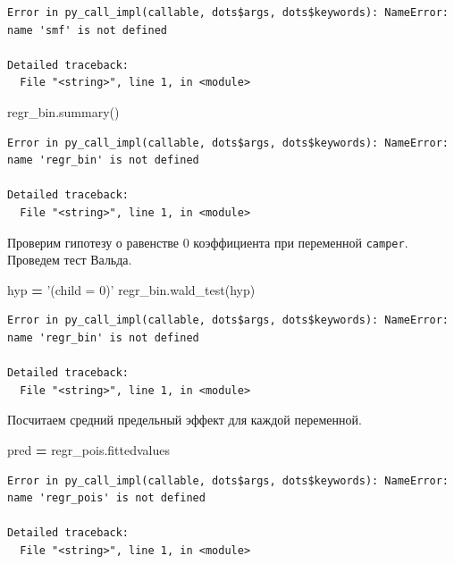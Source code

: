 \documentclass[]{book}
\newenvironment{Shaded}{\begin{snugshade}}{\end{snugshade}}
\newcommand{\NormalTok}[1]{#1}
\newcommand{\OperatorTok}[1]{\textcolor[rgb]{0.81,0.36,0.00}{\textbf{#1}}}
\newcommand{\StringTok}[1]{\textcolor[rgb]{0.31,0.60,0.02}{#1}}
\begin{document}
\begin{verbatim}
Error in py_call_impl(callable, dots$args, dots$keywords): NameError: name 'smf' is not defined

Detailed traceback: 
  File "<string>", line 1, in <module>
\end{verbatim}

\begin{Shaded}
\begin{Highlighting}[]
\NormalTok{regr_bin.summary()}
\end{Highlighting}
\end{Shaded}

\begin{verbatim}
Error in py_call_impl(callable, dots$args, dots$keywords): NameError: name 'regr_bin' is not defined

Detailed traceback: 
  File "<string>", line 1, in <module>
\end{verbatim}

Проверим гипотезу о равенстве 0 коэффициента при переменной \texttt{camper}. Проведем тест Вальда.

\begin{Shaded}
\begin{Highlighting}[]
\NormalTok{hyp }\OperatorTok{=} \StringTok{'(child = 0)'}
\NormalTok{regr_bin.wald_test(hyp)}
\end{Highlighting}
\end{Shaded}

\begin{verbatim}
Error in py_call_impl(callable, dots$args, dots$keywords): NameError: name 'regr_bin' is not defined

Detailed traceback: 
  File "<string>", line 1, in <module>
\end{verbatim}

Посчитаем средний предельный эффект для каждой переменной.

\begin{Shaded}
\begin{Highlighting}[]
\NormalTok{pred }\OperatorTok{=}\NormalTok{ regr_pois.fittedvalues}
\end{Highlighting}
\end{Shaded}

\begin{verbatim}
Error in py_call_impl(callable, dots$args, dots$keywords): NameError: name 'regr_pois' is not defined

Detailed traceback: 
  File "<string>", line 1, in <module>
\end{verbatim}
\end{document}
